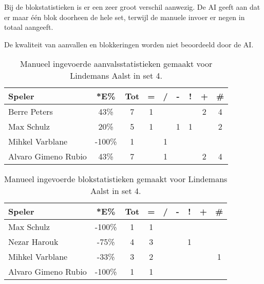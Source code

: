 Bij de blokstatistieken is er een zeer groot verschil aanwezig. De AI geeft aan dat er maar één blok doorheen de hele set, terwijl de manuele invoer er negen in totaal aangeeft.

De kwaliteit van aanvallen en blokkeringen worden niet beoordeeld door de AI. 

\begin{table}[ht!]
    \centering
    \scriptsize
    \begin{tabular}{|l|c|c|c|c|c|c|c|c|}
        \hline
        \textbf{Speler} & *E\% & Tot & = & / & - & ! & + & \# \\ \hline
        Berre Peters & 43\% & 7 & 1 &  &  & & 2 & 4 \\ 
        Max Schulz & 20\% & 5 & 1 &  & 1 & 1 & & 2 \\ 
        Mihkel Varblane & -100\% & 1 &  & 1 &  &  &  & \\ 
        Alvaro Gimeno Rubio & 43\% & 7 &  & 1 & & & 2 & 4 \\ \hline
    \end{tabular}
    \caption[Manueel ingevoerde aanvalsstatistieken gemaakt Lindemans Aalst in set 4]{\label{tab:PL3AttAalstMan4}Manueel ingevoerde aanvalsstatistieken gemaakt voor Lindemans Aalst in set 4.}
\end{table}

\begin{table}[ht!]
    \centering
    \scriptsize
    \begin{tabular}{|l|c|c|c|c|c|c|c|c|}
        \hline
        \textbf{Speler} & *E\% & Tot & = & / & - & ! & + & \# \\ \hline
        Max Schulz & -100\% & 1 & 1 &  &  &  &  & \\
        Nezar Harouk & -75\% & 4 & 3 & &  & 1 &  & \\ 
        Mihkel Varblane & -33\% & 3 & 2 &  &  & &  & 1 \\ 
        Alvaro Gimeno Rubio & -100\% & 1 & 1 &  &  &  &  & \\  \hline
    \end{tabular}
    \caption[Manueel ingevoerde blokstatistieken gemaakt Lindemans Aalst in set 4]{\label{tab:PL3BlockAalstMan4}Manueel ingevoerde blokstatistieken gemaakt voor Lindemans Aalst in set 4.}
\end{table}

